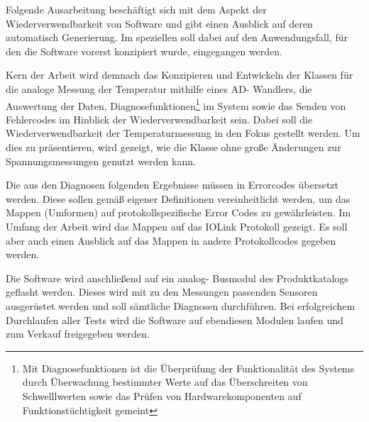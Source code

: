 Folgende Ausarbeitung beschäftigt sich mit dem Aspekt der Wiederverwendbarkeit von Software und gibt einen Ausblick auf deren automatisch Generierung. Im speziellen soll dabei auf den Anwendungsfall, für den die Software vorerst konzipiert wurde, eingegangen werden.

Kern der Arbeit wird demnach das Konzipieren und Entwickeln der Klassen für die analoge Messung der Temperatur mithilfe eines AD- Wandlers, die Auswertung der Daten, Diagnosefunktionen\footnote{Mit Diagnosefunktionen ist die Überprüfung der Funktionalität des Systems durch Überwachung bestimmter Werte auf das Überschreiten von Schwelllwerten sowie das Prüfen von Hardwarekomponenten auf Funktionstüchtigkeit gemeint} 
im System sowie das Senden von Fehlercodes im Hinblick der Wiederverwendbarkeit sein.
Dabei soll die Wiederverwendbarkeit der Temperaturmessung in den Fokus gestellt werden. 
Um dies zu präsentieren, wird gezeigt, wie die Klasse ohne große Änderungen zur Spannungsmessungen genutzt werden kann.

Die aus den Diagnosen folgenden Ergebnisse müssen in Errorcodes übersetzt werden. 
Diese sollen gemäß eigener Definitionen vereinheitlicht werden, um das Mappen (Umformen) auf protokollspezifische Error Codes zu gewährleisten.
Im Umfang der Arbeit wird das Mappen auf das IOLink Protokoll gezeigt.
Es soll aber auch einen Ausblick auf das Mappen in andere Protokollcodes gegeben werden.

Die Software wird anschließend auf ein analog- Busmodul des Produktkatalogs geflasht werden.
Dieses wird mit zu den Messungen passenden Sensoren ausgerüstet werden und soll sämtliche Diagnosen durchführen.
Bei erfolgreichem Durchlaufen aller Tests wird die Software auf ebendiesen Modulen laufen und zum Verkauf freigegeben werden.
